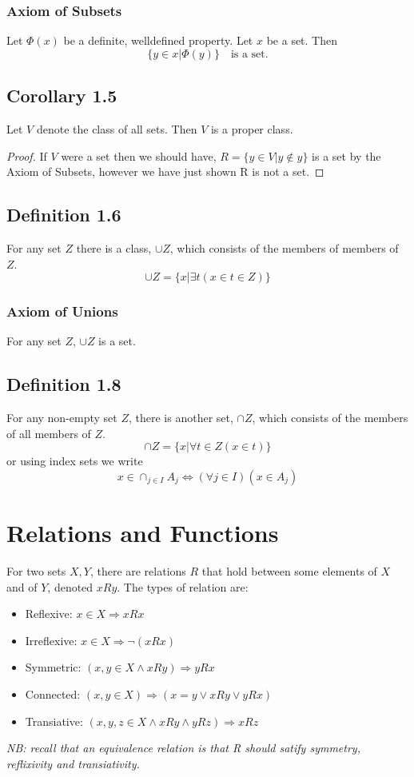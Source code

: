 \documentclass[a4paper, 12pt, twoside]{article}
\begin{document}
\subsubsection*{Axiom of Subsets}
Let $\Phi(x)$ be a definite, welldefined property. Let $x$ be a set. Then
$$ \{y\in x|\Phi(y)\}\quad\text{is a set.}$$
\subsection*{Corollary 1.5}
Let $V$ denote the class of all sets. Then $V$ is a proper class.
\begin{proof}
    If $V$ were a set then we should have, $R=\{y\in V|y\notin y\}$ is a set by the Axiom of Subsets, however we  have just shown R is not a set.
\end{proof}
\subsection*{Definition 1.6}
For any set $Z$ there is a class, $\cup Z$, which consists of the members of members of $Z$.
$$\cup Z=\{x|\exists t (x\in t\in Z)\}$$
\subsubsection*{Axiom of Unions}
For any set $Z$, $\cup Z$ is a set.
\subsection*{Definition 1.8}
For any non-empty set $Z$, there is another set, $\cap Z$, which consists of the members of all members of $Z$.
$$\cap Z=\{x|\forall t\in Z(x\in t)\}$$
or using index sets we write
$$x\in \cap_{j\in I}A_{j}\iff (\forall j\in I)(x \in A_{j}) $$

\newpage
\section{Relations and Functions}
For two sets $X,Y$, there are relations $R$ that hold between some elements of $X$ and of $Y$, denoted $xRy$. The types of relation are:
\begin{itemize}
    \item Reflexive:  $x\in X \Rightarrow xRx$
    \item Irreflexive:  $x\in X \Rightarrow \neg (xRx)$
    \item Symmetric:  $(x,y\in X \wedge xRy) \Rightarrow yRx$
    \item Connected:  $(x,y\in X) \Rightarrow (x=y\vee xRy\vee yRx)$
    \item Transiative:  $(x,y,z\in X \wedge xRy \wedge yRz) \Rightarrow xRz$
\end{itemize}
\textit{NB: recall that an \emph{equivalence relation} is that R should satify symmetry, reflixivity and transiativity.}
\end{document}

